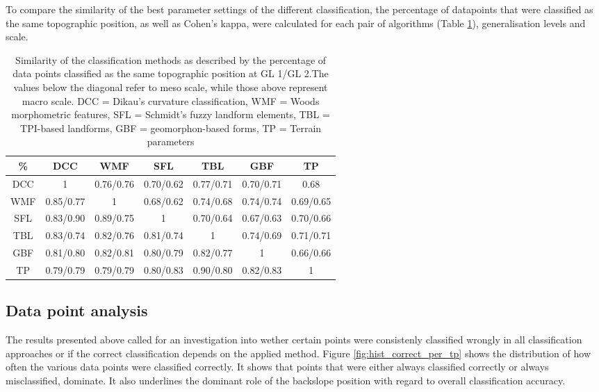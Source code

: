 \documentclass[final,1p,times,twocolumn,authoryear]{elsarticle}
\begin{document}
To compare the similarity of the best parameter settings of the different classification, the percentage of datapoints that were classified as the same topographic position, as well as Cohen's kappa, were calculated for each pair of algorithms (Table \ref{table:similarity_matrix}), generalisation levels and scale. 
\begin{table}[ht]
\caption{Similarity of the classification methods as described by the percentage of data points classified as the same topographic position at GL 1/GL 2.The values below the diagonal refer to meso scale, while those above represent macro scale. DCC = Dikau's curvature classification, WMF = Woods morphometric features, SFL = Schmidt's fuzzy landform elements, TBL = TPI-based landforms, GBF = geomorphon-based forms, TP = Terrain parameters}
\centering
\begin{tabular}{ccccccc}
  \hline
\%  & DCC & WMF &SFL &TBL & GBF & TP \\ 
  \hline
DCC &1 & 0.76/0.76 & 0.70/0.62 & 0.77/0.71 & 0.70/0.71 & 0.68 \\ 
WMF &0.85/0.77  & 1 & 0.68/0.62 & 0.74/0.68 & 0.74/0.74 & 0.69/0.65 \\ 
SFL & 0.83/0.90 & 0.89/0.75 & 1 & 0.70/0.64 & 0.67/0.63 & 0.70/0.66 \\ 
TBL & 0.83/0.74 &0.82/0.76  &0.81/0.74  & 1 & 0.74/0.69 & 0.71/0.71 \\ 
GBF &0.81/0.80  &0.82/0.81  & 0.80/0.79  & 0.82/0.77 & 1 & 0.66/0.66 \\ 
TP &0.79/0.79  &0.79/0.79  &0.80/0.83  &0.90/0.80  &0.82/0.83  & 1 \\ 
   \hline
\end{tabular}
\label{table:similarity_matrix}
\end{table}



\subsection{Data point analysis} 
The results presented above called for an investigation into wether certain points were consistenly classified wrongly in all classification approaches or if the correct classification depends on the applied method. Figure \ref{fig:hist_correct_per_tp} shows the distribution of how often the various data points were classified correctly. It shows that points that were either always classified correctly or always misclassified, dominate. It also underlines the dominant role of the backslope position with regard to overall classification accuracy.
\end{document}
